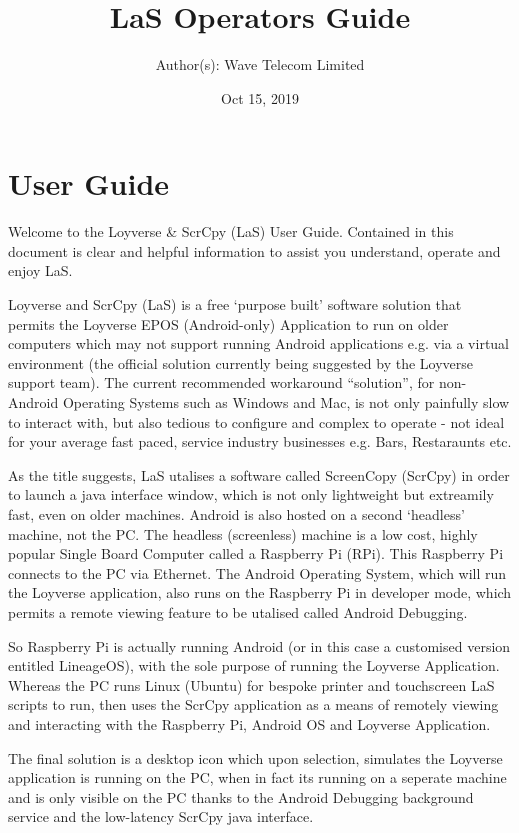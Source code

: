 \documentclass[letterpaper,10pt,openany,oneside,english]{sphinxmanual}
\title{LaS Operators Guide}
\date{Oct 15, 2019}
\author{Author(s): Wave Telecom Limited}
\begin{document}
\maketitle
\sphinxtableofcontents
{}\label{\detokenize{index::doc}}



\chapter{User Guide}
\label{\detokenize{index:user-guide}}
\noindent{}

Welcome to the Loyverse \& ScrCpy (LaS) User Guide.
Contained in this document is clear and helpful information to assist you understand, operate and enjoy LaS.

Loyverse and ScrCpy (LaS) is a free ‘purpose built’ software solution that permits the Loyverse EPOS (Android-only) Application to run on older computers which may not support running Android applications e.g. via a virtual environment (the official solution currently being suggested by the Loyverse support team). The current recommended workaround “solution”, for non-Android Operating Systems such as Windows and Mac, is not only painfully slow to interact with, but also tedious to configure and complex to operate - not ideal for your average fast paced, service industry businesses e.g. Bars, Restaraunts etc.

As the title suggests, LaS utalises a software called ScreenCopy (ScrCpy) in order to launch a java interface window, which is not only lightweight but extreamily fast, even on older machines. Android is also hosted on a second ‘headless’ machine, not the PC. The headless (screenless) machine is a low cost, highly popular Single Board Computer called a Raspberry Pi (RPi). This Raspberry Pi connects to the PC via Ethernet. The Android Operating System, which will run the Loyverse application, also runs on the Raspberry Pi in developer mode, which permits a remote viewing feature to be utalised called Android Debugging.

So Raspberry Pi is actually running Android (or in this case a customised version entitled LineageOS), with the sole purpose of running the Loyverse Application. Whereas the PC runs Linux (Ubuntu) for bespoke printer and touchscreen LaS scripts to run, then uses the ScrCpy application as a means of remotely viewing and interacting with the Raspberry Pi, Android OS and Loyverse Application.

The final solution is a desktop icon which upon selection, simulates the Loyverse application is running on the PC, when in fact its running on a seperate machine and is only visible on the PC thanks to the Android Debugging background service and the low-latency ScrCpy java interface.
\end{document}
